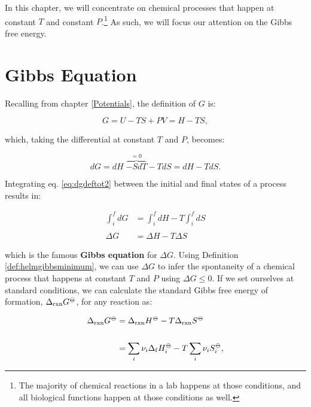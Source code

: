 \documentclass[
  9pt,
]{extbook}
\theoremstyle{definition}
\theoremstyle{definition}
\theoremstyle{definition}
\theoremstyle{remark}
\begin{document}
In this chapter, we will concentrate on chemical processes that happen at constant \(T\) and constant \(P\).\footnote{The majority of chemical reactions in a lab happens at those conditions, and all biological functions happen at those conditions as well.} As such, we will focus our attention on the Gibbs free energy.

\hypertarget{gibbseqsec}{%
\section{Gibbs Equation}\label{gibbseqsec}}

Recalling from chapter \ref{Potentials}, the definition of \(G\) is:

\begin{equation}
G = U -TS +PV = H-TS,
\label{eq:dgdeftot}
\end{equation}

which, taking the differential at constant \(T\) and \(P\), becomes:

\begin{equation}
dG = dH \; \overbrace{-SdT}^{=0} -TdS = dH -TdS.
\label{eq:dgdeftot2}
\end{equation}

Integrating eq. \eqref{eq:dgdeftot2} between the initial and final states of a process results in:

\begin{equation}
\begin{aligned}
\int_i^f dG &= \int_i^f dH -T \int_i^f dS \\
\\
\Delta G &= \Delta H -T \Delta S
\end{aligned}
\label{eq:gibbseq}
\end{equation}

which is the famous \textbf{Gibbs equation} for \(\Delta G\). Using Definition \ref{def:helmgibbsminimum}, we can use \(\Delta G\) to infer the spontaneity of a chemical process that happens at constant \(T\) and \(P\) using \(\Delta G \leq 0\). If we set ourselves at standard conditions, we can calculate the standard Gibbs free energy of formation, \(\Delta_{\text{rxn}} G^{-\kern-6pt{\ominus}\kern-6pt-}\), for any reaction as:

\begin{equation}
\begin{aligned}
\Delta_{\text{rxn}} G^{-\kern-6pt{\ominus}\kern-6pt-}&= \Delta_{\text{rxn}} H^{-\kern-6pt{\ominus}\kern-6pt-}-T \Delta_{\text{rxn}} S^{-\kern-6pt{\ominus}\kern-6pt-}\\
\\
&= \sum_i \nu_i \Delta_{\mathrm{f}} H_i^{-\kern-6pt{\ominus}\kern-6pt-}- T \sum_i \nu_i S_i^{-\kern-6pt{\ominus}\kern-6pt-},
\end{aligned}
\label{eq:gibbseq2}
\end{equation}
\end{document}
